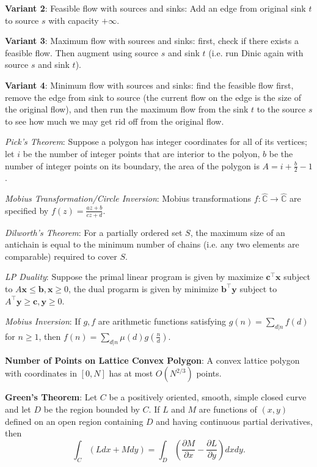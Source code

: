 \textbf{Variant 2}: Feasible flow with sources and sinks: Add an edge from original sink $t$ to source $s$ with capacity $+\infty$.

\textbf{Variant 3}: Maximum flow with sources and sinks: first, check if there exists a feasible flow. Then augment using source $s$ and sink $t$ (i.e. run Dinic again with source $s$ and sink $t$).

\textbf{Variant 4}: Minimum flow with sources and sinks: find the feasible flow first, remove the edge from sink to source (the current flow on the edge is the size of the original flow), and then run the maximum flow from the sink $t$ to the source $s$ to see how much we may get rid off from the original flow.

\emph{Pick's Theorem}: Suppose a polygon has integer coordinates for all of its vertices; let $i$ be the number of integer points that are interior to the polyon, $b$ be the number of integer points on its boundary, the area of the polygon is $A = i + \frac{b}{2}-1$.

\emph{Mobius Transformation/Circle Inversion}: Mobius transformations $f: \hat{\mathbb{C}} \rightarrow \hat{\mathbb{C}}$ are specified by $f(z) = \frac{az+b}{cz+d}$.

\emph{Dilworth's Theorem}: For a partially ordered set $S$, the maximum size of an antichain is equal to the minimum number of chains (i.e. any two elements are comparable) required to cover $S$.

\emph{LP Duality}: Suppose the primal linear program is given by maximize $\mathbf{c}^\top \mathbf{x}$ subject to $A\mathbf{x} \leq \mathbf{b}, \mathbf{x} \geq 0$, the dual progarm is given by minimize $\mathbf{b}^\top \mathbf{y}$ subject to $A^\top \mathbf{y} \geq \mathbf{c}, \mathbf{y} \geq 0$.

\emph{Mobius Inversion}: If $g,f$ are arithmetic functions satisfying $\displaystyle g(n) = \sum_{d | n}f(d)$ for $n \geq 1$, then $\displaystyle f(n) = \sum_{d|n}\mu(d)g(\frac{n}{d})$.

\textbf{Number of Points on Lattice Convex Polygon}: A convex lattice polygon with coordinates in $[0,N]$ has at most $O(N^{2/3})$ points.

\textbf{Green's Theorem}: Let $C$ be a positively oriented, smooth, simple closed curve and let $D$ be the region bounded by $C$. If $L$ and $M$ are functions of $(x,y)$ defined on an open region containing $D$ and having continuous partial derivatives, then
\begin{equation*}
  \int_C (Ldx + Mdy) = \int_D(\frac{\partial M}{\partial x}-\frac{\partial L}{\partial y}) dxdy.
\end{equation*}

